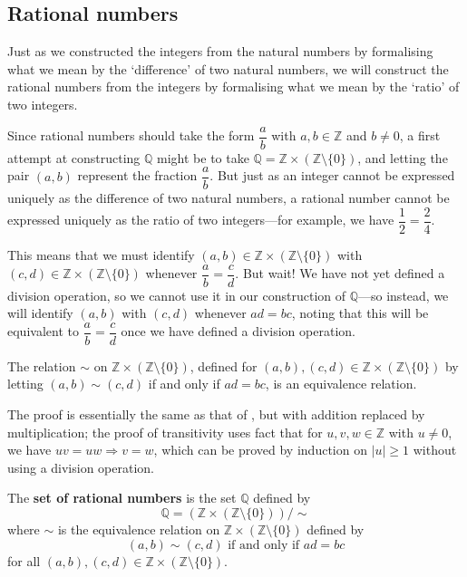 \subsection*{Rational numbers}

Just as we constructed the integers from the natural numbers by formalising what we mean by the `difference' of two natural numbers, we will construct the rational numbers from the integers by formalising what we mean by the `ratio' of two integers.

Since rational numbers should take the form $\dfrac{a}{b}$ with $a,b \in \mathbb{Z}$ and $b \ne 0$, a first attempt at constructing $\mathbb{Q}$ might be to take $\mathbb{Q} = \mathbb{Z} \times (\mathbb{Z} \setminus \{ 0 \})$, and letting the pair $(a,b)$ represent the fraction $\dfrac{a}{b}$. But just as an integer cannot be expressed uniquely as the difference of two natural numbers, a rational number cannot be expressed uniquely as the ratio of two integers---for example, we have $\dfrac{1}{2} = \dfrac{2}{4}$.

This means that we must identify $(a,b) \in \mathbb{Z} \times (\mathbb{Z} \setminus \{ 0 \})$ with $(c,d) \in \mathbb{Z} \times (\mathbb{Z} \setminus \{ 0 \})$ whenever $\dfrac{a}{b} = \dfrac{c}{d}$. But wait! We have not yet defined a division operation, so we cannot use it in our construction of $\mathbb{Q}$---so instead, we will identify $(a,b)$ with $(c,d)$ whenever $ad=bc$, noting that this will be equivalent to $\dfrac{a}{b} = \dfrac{c}{d}$ once we have defined a division operation.

\begin{lemma}
\label{lemEquivalenceRelationToConstructQFromZ}
The relation $\sim$ on $\mathbb{Z} \times (\mathbb{Z} \setminus \{ 0 \})$, defined for $(a,b), (c,d) \in \mathbb{Z} \times (\mathbb{Z} \setminus \{ 0 \})$ by letting $(a,b) \sim (c,d)$ if and only if $ad=bc$, is an equivalence relation.
\end{lemma}

\begin{csketch}
The proof is essentially the same as that of , but with addition replaced by multiplication; the proof of transitivity uses fact that for $u,v,w \in \mathbb{Z}$ with $u \ne 0$, we have $uv=uw \Rightarrow v=w$, which can be proved by induction on $|u| \ge 1$ without using a division operation.
\end{csketch}

\begin{construction}
\label{cnsRationalsFromIntegers}
The \textbf{set of rational numbers} is the set $\mathbb{Q}$ defined by
\[ \mathbb{Q} = (\mathbb{Z} \times (\mathbb{Z} \setminus \{ 0 \})) / {\sim} \]
where $\sim$ is the equivalence relation on $\mathbb{Z} \times (\mathbb{Z} \setminus \{0\})$ defined by
\[ (a,b) \sim (c,d) \text{ if and only if } ad=bc \]
for all $(a,b),(c,d) \in \mathbb{Z} \times (\mathbb{Z} \setminus \{ 0 \})$.
\end{construction}

